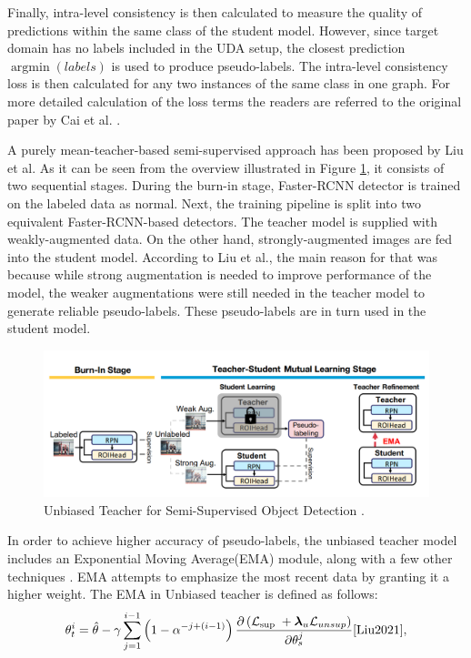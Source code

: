 Finally, intra-level consistency is then calculated to measure the quality of predictions within the same class of the student model. However, since target domain has no labels included in the UDA setup, the closest prediction $\operatorname{argmin} (labels)$ is used to produce pseudo-labels. The intra-level consistency loss is then calculated for any two instances of the same class in one graph. For more detailed calculation of the loss terms the readers are referred to the original paper by Cai et al. \cite{Cai2019}.

A purely mean-teacher-based semi-supervised approach has been proposed by Liu et al. \cite{Liu2021} As it can be seen from the overview illustrated in Figure \ref{unbiased}, it consists of two sequential stages. During the burn-in stage, Faster-RCNN detector is trained on the labeled data as normal. Next, the training pipeline is split into two equivalent Faster-RCNN-based detectors. The teacher model is supplied with weakly-augmented data. On the other hand, strongly-augmented images are fed into the student model. According to Liu et al., the main reason for that was because while strong augmentation is needed to improve performance of the model, the weaker augmentations were still needed in the teacher model to generate reliable pseudo-labels. These pseudo-labels are in turn used in the student model.   
\begin{figure}[htb]
	\begin{center}
		\includegraphics[width=14cm]{./unbiased.png}
	\end{center}
	\caption{Unbiased Teacher for Semi-Supervised Object Detection \cite{Liu2021}.}\label{unbiased}
	\begin{center}
	\end{center}
\end{figure}
\FloatBarrier

In order to achieve higher accuracy of pseudo-labels, the unbiased teacher model includes an Exponential Moving Average(EMA) module, along with a few other techniques \cite{Liu2021}. EMA attempts to emphasize the most recent data by granting it a higher weight. The EMA in Unbiased teacher is defined as follows: 
\begin{equation}
\theta_{t}^{i}=\hat{\theta}-\gamma \sum_{j=1}^{i-1}\left(1-\alpha^{-j+(i-1)}\right) \frac{\partial\left(\mathcal{L}_{\text {sup }}+\boldsymbol{\lambda}_{u} \mathcal{L}_{u n s u p}\right)}{\partial \theta_{s}^{j}}
\label{EMA}
\cite{Liu2021},
\end{equation}

